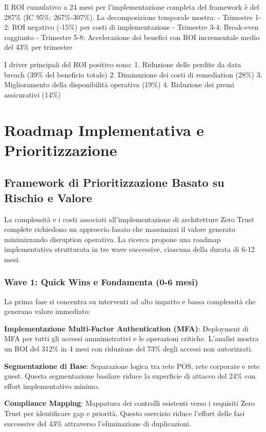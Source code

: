 Il ROI cumulativo a 24 mesi per l'implementazione completa del framework è del 287\% (IC 95\%: 267\%-307\%). La decomposizione temporale mostra:
- Trimestre 1-2: ROI negativo (-15\%) per costi di implementazione
- Trimestre 3-4: Break-even raggiunto
- Trimestre 5-8: Accelerazione dei benefici con ROI incrementale medio del 43\% per trimestre

I driver principali del ROI positivo sono:
1. Riduzione delle perdite da data breach (39\% del beneficio totale)
2. Diminuzione dei costi di remediation (28\%)
3. Miglioramento della disponibilità operativa (19\%)
4. Riduzione dei premi assicurativi (14\%)

\section{Roadmap Implementativa e Prioritizzazione}

\subsection{Framework di Prioritizzazione Basato su Rischio e Valore}

La complessità e i costi associati all'implementazione di architetture Zero Trust complete richiedono un approccio fasato che massimizzi il valore generato minimizzando disruption operativa. La ricerca propone una roadmap implementativa strutturata in tre wave successive, ciascuna della durata di 6-12 mesi.

\subsubsection{Wave 1: Quick Wins e Fondamenta (0-6 mesi)}

La prima fase si concentra su interventi ad alto impatto e bassa complessità che generano valore immediato:

\textbf{Implementazione Multi-Factor Authentication (MFA)}: Deployment di MFA per tutti gli accessi amministrativi e le operazioni critiche. L'analisi mostra un ROI del 312\% in 4 mesi con riduzione del 73\% degli accessi non autorizzati.

\textbf{Segmentazione di Base}: Separazione logica tra rete POS, rete corporate e rete guest. Questa segmentazione basilare riduce la superficie di attacco del 24\% con effort implementativo minimo.

\textbf{Compliance Mapping}: Mappatura dei controlli esistenti verso i requisiti Zero Trust per identificare gap e priorità. Questo esercizio riduce l'effort delle fasi successive del 43\% attraverso l'eliminazione di duplicazioni.

